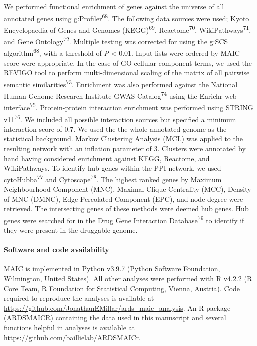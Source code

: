 \documentclass[
  11,
  a4paper,
]{article}
\let\oldparagraph\paragraph
\renewcommand{\paragraph}[1]{\oldparagraph{#1}\mbox{}}
\begin{document}
We performed functional enrichment of genes against the universe of all
annotated genes using g:Profiler\textsuperscript{68}. The following data
sources were used; Kyoto Encyclopaedia of Genes and Genomes
(KEGG)\textsuperscript{69}, Reactome\textsuperscript{70},
WikiPathways\textsuperscript{71}, and Gene Ontology\textsuperscript{72}.
Multiple testing was corrected for using the g:SCS
algorithm\textsuperscript{68}, with a threshold of \emph{P} \textless{}
0.01. Input lists were ordered by MAIC score were appropriate. In the
case of GO cellular component terms, we used the REVIGO tool to perform
multi-dimensional scaling of the matrix of all pairwise semantic
similarities\textsuperscript{73}. Enrichment was also performed against
the National Human Genome Research Institute GWAS
Catalog\textsuperscript{74} using the Enrichr
web-interface\textsuperscript{75}. Protein-protein interaction
enrichment was performed using STRING v11\textsuperscript{76}. We
included all possible interaction sources but specified a minimum
interaction score of 0.7. We used the the whole annotated genome as the
statistical background. Markov Clustering Analysis (MCL) was applied to
the resulting network with an inflation parameter of 3. Clusters were
annotated by hand having considered enrichment against KEGG, Reactome,
and WikiPathways. To identify hub genes within the PPI network, we used
cytoHubba\textsuperscript{77} and Cytoscape\textsuperscript{78}. The
highest ranked genes by Maximum Neighbourhood Component (MNC), Maximal
Clique Centrality (MCC), Density of MNC (DMNC), Edge Percolated
Component (EPC), and node degree were retrieved. The intersecting genes
of these methods were deemed hub genes. Hub genes were searched for in
the Drug Gene Interaction Database\textsuperscript{79} to identify if
they were present in the druggable genome.

\hypertarget{software-and-code-availability}{%
\paragraph{Software and code
availability}\label{software-and-code-availability}}

MAIC is implemented in Python v3.9.7 (Python Software Foundation,
Wilmington, United States). All other analyses were performed with R
v4.2.2 (R Core Team, R Foundation for Statistical Computing, Vienna,
Austria). Code required to reproduce the analyses is available at
\url{https://github.com/JonathanEMillar/ards_maic_analysis}. An R
package (ARDSMAICR) containing the data used in this manuscript and
several functions helpful in analyses is available at
\url{https://github.com/baillielab/ARDSMAICr}.
\end{document}
